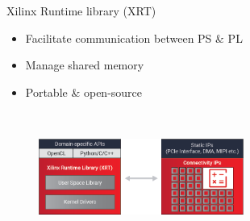 \begin{frame}{Xilinx Runtime library (XRT)}
	\begin{itemize}
	    \item Facilitate communication between PS \& PL
	    \item Manage shared memory
	    \item Portable \& open-source %
	\end{itemize}\\
	\begin{figure}[H]
            \centering
		\includegraphics[width=0.6\textwidth]{Images/Platform/xrt.png}
	\end{figure}%
\end{frame}


